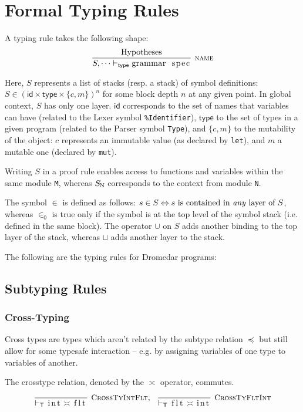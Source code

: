 \documentclass{article}
\newcommand{\code}[1]{\lstinline[columns=fixed]{#1}}
\newcommand{\drmrule}[5]{\frac{#1}{#2\vdash_{\mathsf{#3}}#4}\textsc{\ \small{#5}}}
\newcommand{\mc}[1]{\textnormal{\code{#1}}}
\begin{document}
	\section{Formal Typing Rules}
	
		A typing rule takes the following shape: $$ \drmrule{\mathrm{Hypotheses}}{S,\dots}{type}{\mc{grammar spec}}{name} $$
		
		Here, $S$ represents a list of stacks (resp. a stack) of symbol definitions: $S \in (\mathsf{id} \times \mathsf{type} \times \{c,m\})^n$ for some block depth $n$ at any given point. In global context, $S$ has only one layer. $\mathsf{id}$ corresponds to the set of names that variables can have (related to the Lexer symbol \texttt{\%Identifier}), $\mathsf{type}$ to the set of types in a given program (related to the Parser symbol \texttt{Type}), and $\{c,m\}$ to the mutability of the object: $c$ represents an immutable value (as declared by \code{let}), and $m$ a mutable one (declared by \code{mut}).
		
		Writing $S$ in a proof rule enables access to functions and variables within the same module \code{M}, whereas $S_{\mc{N}}$ corresponds to the context from module \code{N}.
		
		The symbol $\in$ is defined as follows: $s\in S \Leftrightarrow \textnormal{$s$ is contained in \textit{any} layer of $S$}$, whereas $\in_0$ is true only if the symbol is at the top level of the symbol stack (i.e. defined in the same block). The operator $\cup$ on $S$ adds another binding to the top layer of the stack, whereas $\sqcup$ adds another layer to the stack.
		
		The following are the typing rules for Dromedar programs:
		
		\subsection{Subtyping Rules}
		
			\subsubsection{Cross-Typing}
			
				Cross types are types which aren't related by the subtype relation $\preceq$ but still allow for some typesafe interaction -- e.g. by assigning variables of one type to variables of another.
				
				The crosstype relation, denoted by the $\asymp$ operator, commutes.
				\begin{align*}
					\drmrule{}{}{T}{\mc{int} \asymp \mc{flt}}{CrossTyIntFlt},\ \ 
					\drmrule{}{}{T}{\mc{flt} \asymp \mc{int}}{CrossTyFltInt}
				\end{align*}
		
\end{document}
